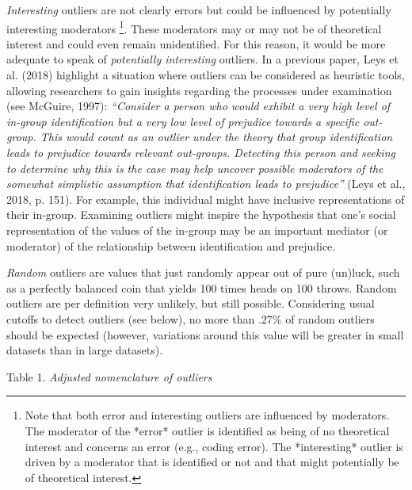 \documentclass[man,floatsintext]{apa6}
\let\rmarkdownfootnote\footnote%
\def\footnote{\protect\rmarkdownfootnote}
\begin{document}
\emph{Interesting} outliers are not clearly errors but could be
influenced by potentially interesting moderators
\footnote{Note that both error and interesting outliers are influenced by moderators. The moderator of the *error* outlier is identified as being of no theoretical interest and concerns an error (e.g., coding error). The *interesting* outlier is driven by a moderator that is identified or not and that might potentially be of theoretical interest.}.
These moderators may or may not be of theoretical interest and could
even remain unidentified. For this reason, it would be more adequate to
speak of \emph{potentially interesting} outliers. In a previous paper,
Leys et al. (2018) highlight a situation where outliers can be
considered as heuristic tools, allowing researchers to gain insights
regarding the processes under examination (see McGuire, 1997):
\emph{\enquote{Consider a person who would exhibit a very high level of
in-group identification but a very low level of prejudice towards a
specific out-group. This would count as an outlier under the theory that
group identification leads to prejudice towards relevant out-groups.
Detecting this person and seeking to determine why this is the case may
help uncover possible moderators of the somewhat simplistic assumption
that identification leads to prejudice}} (Leys et al., 2018, p. 151).
For example, this individual might have inclusive representations of
their in-group. Examining outliers might inspire the hypothesis that
one's social representation of the values of the in-group may be an
important mediator (or moderator) of the relationship between
identification and prejudice.

\emph{Random} outliers are values that just randomly appear out of pure
(un)luck, such as a perfectly balanced coin that yields 100 times heads
on 100 throws. Random outliers are per definition very unlikely, but
still possible. Considering usual cutoffs to detect outliers (see
below), no more than .27\% of random outliers should be expected
(however, variations around this value will be greater in small datasets
than in large datasets).

Table 1. \emph{Adjusted nomenclature of outliers}
\end{document}
